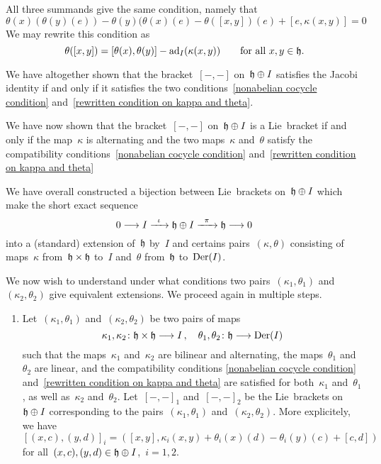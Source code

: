 \begin{fluff}
\begin{enumerate}
\begin{itemize*}
          All three summands give the same condition, namely that
          \[
            \theta(x)( \theta(y)(e) )
            -
            \theta(y)( \theta(x)(e)
            -
            \theta([x,y])(e)
            +
            [e, \kappa(x,y)]
            =
            0
          \]
          We may rewrite this condition as
          \begin{equation}
            \label{rewritten condition on kappa and theta}
            \theta([x,y])
            =
            [\theta(x), \theta(y)]
            -
            \operatorname{ad}_I( \kappa(x,y) )
            \qquad
            \text{for all~$x, y \in \mathfrak{h}$.}
          \end{equation}
      \end{itemize*}
      We have altogether shown that the bracket~$[-,-]$ on~$\mathfrak{h} \oplus I$ satisfies the Jacobi identity if and only if it satisfies the two conditions~\eqref{nonabelian cocycle condition} and~\eqref{rewritten condition on kappa and theta}.

      We have now shown that the bracket~$[-,-]$ on~$\mathfrak{h} \oplus I$ is a Lie~bracket if and only if the map~$\kappa$ is alternating and the two maps~$\kappa$ and~$\theta$ satisfy the compatibility conditions~\eqref{nonabelian cocycle condition} and~\eqref{rewritten condition on kappa and theta}
  \end{enumerate}
  We have overall constructed a bijection between Lie~brackets on~$\mathfrak{h} \oplus I$ which make the short exact sequence
  \[
    0
    \to
    I
    \xto{\iota}
    \hlie \oplus I
    \xto{\pi}
    \hlie
    \to
    0
  \]
  into a (standard) extension of~$\mathfrak{h}$ by~$I$ and certains pairs~$(\kappa, \theta)$ consisting of maps~$\kappa$ from~$\mathfrak{h} \times \mathfrak{h}$ to~$I$ and~$\theta$ from~$\mathfrak{h}$ to~$\operatorname{Der}(I)$.

  We now wish to understand under what conditions two pairs~$(\kappa_1, \theta_1)$ and~$(\kappa_2, \theta_2)$ give equivalent extensions.
  We proceed again in multiple steps.
  \begin{enumerate}[resume*]
    \item
      Let~$(\kappa_1, \theta_1)$ and~$(\kappa_2, \theta_2)$ be two pairs of maps
      \[
        \kappa_1, \kappa_2
        \colon
        \hlie \times \hlie
        \to
        I \,,
        \quad
        \theta_1, \theta_2
        \colon
        \hlie
        \to
        \Der(I)
      \]
      such that the maps~$\kappa_1$ and~$\kappa_2$ are bilinear and alternating, the maps~$\theta_1$ and~$\theta_2$ are linear, and the compatibility conditions \eqref{nonabelian cocycle condition} and~\eqref{rewritten condition on kappa and theta} are satisfied for both~$\kappa_1$ and~$\theta_1$, as well as~$\kappa_2$ and~$\theta_2$.
      Let~$[-,-]_1$ and~$[-,-]_2$ be the Lie~brackets on~$\mathfrak{h} \oplus I$ corresponding to the pairs~$(\kappa_1, \theta_1)$ and~$(\kappa_2, \theta_2)$.
      More explicitely, we have
      \[
        [(x,c), (y,d)]_i
        =
        (
          [x,y],
          \kappa_i(x,y) + \theta_i(x)(d) - \theta_i(y)(c) + [c,d]
        )
      \]
      for all~$(x,c), (y,d) \in \mathfrak{h} \oplus I$,~$i = 1, 2$.


\end{enumerate}
\end{fluff}
